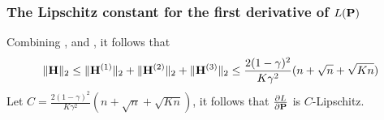 \subsubsection{The Lipschitz constant for the first derivative of $L(\mathbf{{P}})$}
Combining ,  and , it follows that
\begin{equation*}
	\|\mathbf{{H}}\|_2 \leq \|\mathbf{{H}}^{(1)}\|_2 +  \|\mathbf{{H}}^{(2)}\|_2 +  \|\mathbf{{H}}^{(3)}\|_2 \leq \frac{2(1-\gamma)^2}{K \gamma^2} (n+ \sqrt{n} + \sqrt{Kn})
\end{equation*}
Let $C = \frac{2(1-\gamma)^2}{K \gamma^2} (n+ \sqrt{n} + \sqrt{Kn})$, it follows that $\frac{\partial L}{\partial \mathbf{{P}}}$ is $C$-Lipschitz. 


